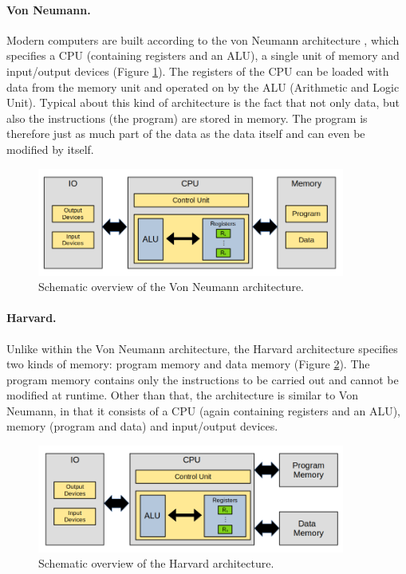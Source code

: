 \paragraph{Von Neumann.} Modern computers are built according to the von Neumann architecture \cite{vonneumann-wiki}, which specifies a CPU (containing registers and an ALU), a single unit of memory and input/output devices (Figure \ref{fig:vonneumann}). The registers of the CPU can be loaded with data from the memory unit and operated on by the ALU (Arithmetic and Logic Unit). Typical about this kind of architecture is the fact that not only data, but also the instructions (the program) are stored in memory. The program is therefore just as much part of the data as the data itself and can even be modified by itself.
\begin{figure}[H]
  \centering
  \includegraphics[width=0.9\textwidth]{img/vonneumann}
  \caption{Schematic overview of the Von Neumann architecture.}
  \label{fig:vonneumann}
\end{figure}

\paragraph{Harvard.} Unlike within the Von Neumann architecture, the Harvard architecture specifies two kinds of memory: program memory and data memory (Figure \ref{fig:harvard}). The program memory contains only the instructions to be carried out and cannot be modified at runtime. Other than that, the architecture is similar to Von Neumann, in that it consists of a CPU (again containing registers and an ALU), memory (program and data) and input/output devices.
\begin{figure}[H]
  \centering
  \includegraphics[width=0.9\textwidth]{img/harvard}
  \caption{Schematic overview of the Harvard architecture.}
  \label{fig:harvard}
\end{figure}

